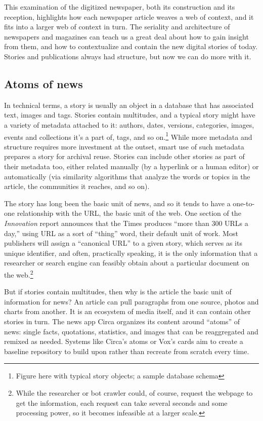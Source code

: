 This examination of the digitized newspaper, both its construction and its reception, highlights how each newspaper article weaves a web of context, and it fits into a larger web of context in turn. The seriality and architecture of newspapers and magazines can teach us a great deal about how to gain insight from them, and how to contextualize and contain the new digital stories of today. Stories and publications always had structure, but now we can do more with it.

\subsection{Atoms of news}

In technical terms, a story is usually an object in a database that has associated text, images and tags. Stories contain multitudes, and a typical story might have a variety of metadata attached to it: authors, dates, versions, categories, images, events and collections it's a part of, tags, and so on.\footnote{Figure here with typical story objects; a sample database schema} While more metadata and structure requires more investment at the outset, smart use of such metadata prepares a story for archival reuse. Stories can include other stories as part of their metadata too, either related manually (by a hyperlink or a human editor) or automatically (via similarity algorithms that analyze the words or topics in the article, the communities it reaches, and so on).


The story has long been the basic unit of news, and so it tends to have a one-to-one relationship with the URL, the basic unit of the web. One section of the \emph{Innovation} report announces that the Times produces ``more than 300 URLs a day,'' using URL as a sort of ``thing'' word, their default unit of work.\autocite[27]{_innovation_2014} Most publishers will assign a ``canonical URL'' to a given story, which serves as its unique identifier, and often, practically speaking, it is the only information that a researcher or search engine can feasibly obtain about a particular document on the web.\footnote{While the researcher or bot crawler could, of course, request the webpage to get the information, each request can take several seconds and some processing power, so it becomes infeasible at a larger scale.}

But if stories contain multitudes, then why is the article the basic unit of information for news? An article can pull paragraphs from one source, photos and charts from another. It is an ecosystem of media itself, and it can contain other stories in turn. The news app Circa organizes its content around ``atoms'' of news: single facts, quotations, statistics, and images that can be reaggregated and remixed as needed. Systems like Circa's atoms or Vox's cards aim to create a baseline repository to build upon rather than recreate from scratch every time.

